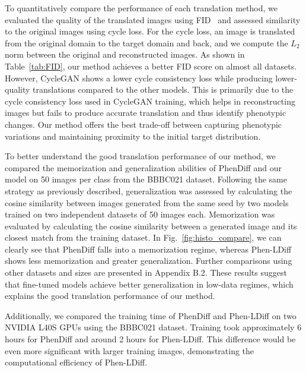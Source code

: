 To quantitatively compare the performance of each translation method, we evaluated the quality of the translated images using FID~\cite{fid} and assessed similarity to the original images using cycle loss. For the cycle loss, an image is translated from the original domain to the target domain and back, and we compute the $L_2$ norm between the original and reconstructed images. As shown in Table~\ref{tab:FID}, our method achieves a better FID score on almost all datasets. However, CycleGAN shows a lower cycle consistency loss while producing lower-quality translations compared to the other models. This is primarily due to the cycle consistency loss used in CycleGAN training, which helps in reconstructing images but fails to produce accurate translation and thus identify phenotypic changes. Our method offers the best trade-off between capturing phenotypic variations and maintaining proximity to the initial target distribution. 

To better understand the good translation performance of our method, we compared the memorization and generalization abilities of PhenDiff and our model on 50 images per class from the BBBC021 dataset. Following the same strategy as previously described, generalization was assessed by calculating the cosine similarity between images generated from the same seed by two models trained on two independent datasets of 50 images each. Memorization was evaluated by calculating the cosine similarity between a generated image and its closest match from the training dataset. In Fig.~\ref{fig:histo_compare}, we can clearly see that PhenDiff falls into a memorization regime, whereas Phen-LDiff shows less memorization and greater generalization. Further comparisons using other datasets and sizes are presented in Appendix B.2. These results suggest that fine-tuned models achieve better generalization in low-data regimes, which explains the good translation performance of our method.

Additionally, we compared the training time of PhenDiff and Phen-LDiff on two NVIDIA L40S GPUs using the BBBC021 dataset. Training took approximately 6 hours for PhenDiff and around 2 hours for Phen-LDiff. This difference would be even more significant with larger training images, demonstrating the computational efficiency of Phen-LDiff.














